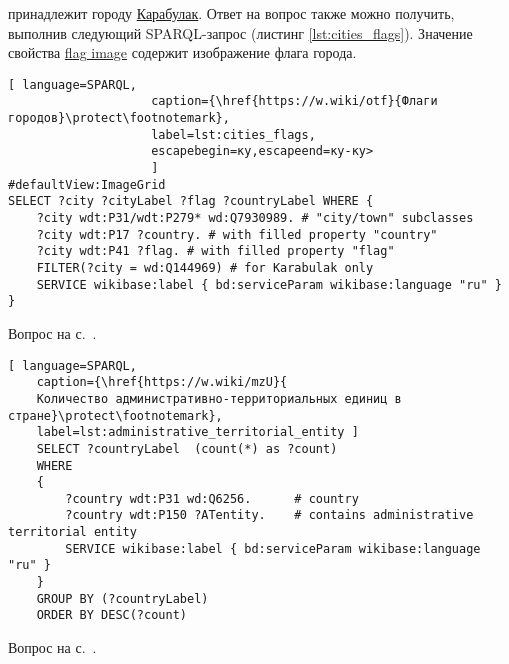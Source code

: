 \begin{task}
    \label{answer:cities_flags}
     принадлежит городу \href{https://w.wiki/oLF}{Карабулак}. Ответ на вопрос также можно получить, выполнив следующий SPARQL-запрос (листинг \ref{lst:cities_flags}). Значение свойства \href{https://www.wikidata.org/wiki/Property:P41}{flag image} содержит изображение флага города.
    
    \begin{lstlisting}[ language=SPARQL, 
                    caption={\href{https://w.wiki/otf}{Флаги городов}\protect\footnotemark},
                    label=lst:cities_flags, 
                    escapebegin=ку,escapeend=ку-ку>
                    ]
#defaultView:ImageGrid
SELECT ?city ?cityLabel ?flag ?countryLabel WHERE {
	?city wdt:P31/wdt:P279* wd:Q7930989. # "city/town" subclasses
	?city wdt:P17 ?country. # with filled property "country"
	?city wdt:P41 ?flag. # with filled property "flag"
	FILTER(?city = wd:Q144969) # for Karabulak only
	SERVICE wikibase:label { bd:serviceParam wikibase:language "ru" }
}
\end{lstlisting}
    
    \small{Вопрос на с.~\pageref{lst:countries_sister_cities_with_Russia}.}
\end{task}


\begin{task}
	\label{answer:administrative_territorial}
	
	\begin{lstlisting}[ language=SPARQL, 
	caption={\href{https://w.wiki/mzU}{
	Количество административно-территориальных единиц в стране}\protect\footnotemark},
	label=lst:administrative_territorial_entity	]
	SELECT ?countryLabel  (count(*) as ?count)
	WHERE
	{
		?country wdt:P31 wd:Q6256.      # country
		?country wdt:P150 ?ATentity.    # contains administrative territorial entity
		SERVICE wikibase:label { bd:serviceParam wikibase:language "ru" }
	}
	GROUP BY (?countryLabel)
	ORDER BY DESC(?count)
	\end{lstlisting}
	
	\small{Вопрос на с.~\pageref{lst:age_of_country}.}
\end{task}

